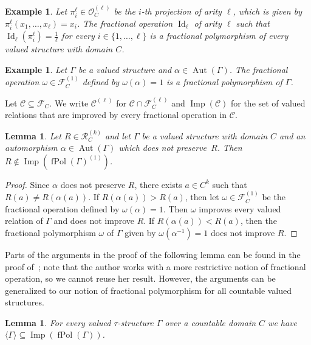 \documentclass[nonacm]{acmart}
\DeclareMathOperator{\Imp}{Imp}
\DeclareMathOperator{\Aut}{Aut}
\DeclareMathOperator{\fPol}{fPol}
\DeclareMathOperator{\Id}{Id}
\newtheorem{lemma}[theorem]{Lemma}
\newtheorem{expl}[theorem]{Example}
\begin{document}
\begin{expl}\label{expl:id}
Let $\pi^\ell_i \in {\mathscr O}^{(\ell)}_C$ be the $i$-th projection of arity $\ell$, which is given by $\pi^\ell_i(x_1,\dots,x_\ell) = x_i$.
The fractional operation $\Id_\ell$ of arity $\ell$ such that $\Id_\ell(\pi^{\ell}_{i}) = \frac{1}{\ell}$ 
for every $i \in \{1,\dots,\ell\}$ is a fractional polymorphism of every valued structure with domain $C$. 
\end{expl}

\begin{expl}\label{expl:aut}
Let $\Gamma$ be a valued structure and $\alpha\in \Aut(\Gamma)$. The fractional operation $\omega \in \mathscr{F}_C^{(1)}$ defined by $\omega(\alpha)=1$ is a fractional polymorphism of $\Gamma$.
\end{expl}


Let ${\mathscr C} \subseteq {\mathscr F}_C$. 
We write ${\mathscr C}^{(\ell)}$ for 
${\mathscr C} \cap {\mathscr F}^{(\ell)}_C$
and $\Imp({\mathscr C})$ for the set of valued relations that are improved by every fractional operation in 
${\mathscr C}$.

\begin{lemma}
\label{lem:aut}
Let $R \in {\mathscr R}^{(k)}_C$ and let $\Gamma$ be a valued structure with domain $C$ and an automorphism $\alpha \in \Aut(\Gamma)$ which does not preserve~$R$. Then 
$R \notin \Imp(\fPol(\Gamma)^{(1)})$.
\end{lemma}
\begin{proof}
Since $\alpha$ does not preserve $R$, there exists $a \in C^k$ such that $R(a) \neq R(\alpha(a))$. If $R(\alpha(a)) > R(a)$, then 
let $\omega \in {\mathscr F}_C^{(1)}$ be the fractional operation 
defined by $\omega(\alpha) = 1$. 
Then $\omega$ improves every valued relation of $\Gamma$ and does not improve $R$. If $R(\alpha(a)) < R(a)$, then the fractional polymorphism $\omega$ of $\Gamma$ given by $\omega(\alpha^{-1}) = 1$ does not improve $R$. 
\end{proof}

Parts of the arguments in the proof of the following lemma can be found in the proof of~\cite[Lemma 7.2.1]{ViolaThesis}; note that the author works with a more restrictive notion of fractional operation, so we cannot reuse her result. However, the arguments can be generalized to our notion of fractional polymorphism for all countable valued structures.

\begin{lemma}\label{lem:easy}
For every 
valued $\tau$-structure $\Gamma$ 
over a countable domain $C$
we have 
$\langle \Gamma \rangle \subseteq \Imp(\fPol(\Gamma))$.
\end{lemma}
\end{document}

